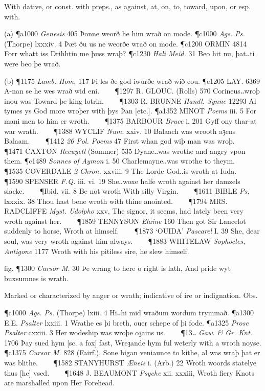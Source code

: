 \begin{description}[wide, labelwidth=!, labelindent=0pt]
\begin{myenumerate}
 With dative, or const. with preps., as against, at, on, to, toward, upon, or esp. with.

(a) \P a1000 \textit{Genesis}  405 Þonne weorð he him wrað on mode.
\P c1000  \textit{Ags. Ps.} (Thorpe) lxxxiv. 4 Þæt ðu us ne weorðe wrað on mode.
\P c1200 ORMIN  4814 Forr whatt iss Drihhtin me þuss wraþ?
\P c1230 \textit{Hali  Meid.} 31 Beo hit nu, þat‥ti were beo þe wrað.

(b) \P 1175 \textit{Lamb.  Hom.} 117 Þi les ðe god iwurðe wrað wið eou. 
\P c1205 LAY.  6369 A-nan se he wes wrað wid eni.    
\P 1297 R. GLOUC.  (Rolls) 570 Corineus‥wroþ inou was Toward þe king lotrin.    
\P 1303 R. BRUNNE  \textit{Handl. Synne} 12293 Al tymes ys God more wroþer with þys Þan [etc.].
\P a1352 MINOT  \textit{Poems} iii. 5 For mani men to him er wroth.    
\P 1375 BARBOUR  \textit{Bruce} i. 201 Gyff ony thar-at war wrath.    
\P 1388 WYCLIF  \textit{Num.} xxiv. 10 Balaach was wrooth aȝens Balaam.    
\P 1412 \textit{26 Pol.  Poems} 47 First whan god wiþ man was wroþ.    
\P 1471 CAXTON  \textit{Recuyell} (Sommer) 535 Dyane‥was wrothe and angry vpon them.
\P c1489 \textit{Sonnes of Aymon} i. 50 Charlemayne‥was wrothe to theym.    
\P 1535 COVERDALE  \textit{2 Chron.} xxviii. 9 The Lorde God‥is wroth at Iuda.    
\P 1590 SPENSER  \textit{F.Q.} iii. vi. 19 She‥woxe halfe wroth against her damzels slacke.    
\P Ibid. vii. 8 Be not wroth With silly Virgin.    
\P 1611 BIBLE  \textit{Ps.} lxxxix. 38 Thou hast bene wroth with thine anointed.    
\P 1794 MRS. RADCLIFFE  \textit{Myst. Udolpho} xxv, The signor, it seems, had lately been very wroth against her.    
\P 1859 TENNYSON  \textit{Elaine} 160 Then got Sir Lancelot suddenly to horse, Wroth at himself.    
\P 1873 ‘OUIDA’  \textit{Pascarel} I. 39 She, dear soul, was very wroth against him always.    
\P 1883 WHITELAW \textit{Sophocles, Antigone} 1177 Wroth  with his pitiless sire, he slew himself.

\noindent fig. \P 1300  \textit{Cursor M.} 30 Þe wrang to here o right is lath, And pride wyt buxsumnes is wrath.

 Marked or characterized by anger or wrath; indicative of ire or indignation. Obs.

\P c1000  \textit{Ags. Ps.} (Thorpe) lxiii. 4 Hi‥hi mid wraðum wordum trymmað.
\P a1300 E.E.  \textit{Psalter} lxxiii. 1 Wrathe es þi breth, ouer schepe of þi fode.
\P a1325 \textit{Prose  Psalter} cxxiii. 3 Her wodeship was wroþe oȝains us.    
\P 13‥ \textit{Gaw. \& Gr. Knt.} 1706 Þay  sued hym [sc. a fox] fast, Wreȝande hym ful weterly with a wroth noyse.
\P c1375  \textit{Cursor M.} 828 (Fairf.), Sone bigan veniaunce to kithe, al was wraþ þat er was blithe.    
\P 1582 STANYHURST  \textit{Æneis} i. (Arb.) 22 Wroth woords statelye thus [he] vsed.    
\P 1648 J. BEAUMONT  \textit{Psyche} xii. xxxiii, Wroth fiery Knots are marshalled upon Her Forehead.


\end{myenumerate}
\end{description}
